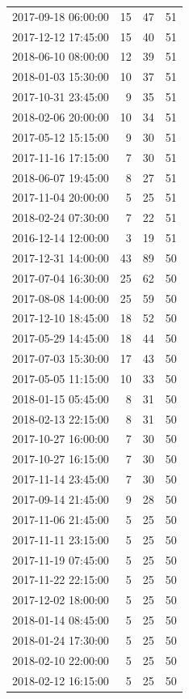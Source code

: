 \begin{tabular}{lrrr}
2017-09-18 06:00:00 & 15 & 47 & 51 \\
2017-12-12 17:45:00 & 15 & 40 & 51 \\
2018-06-10 08:00:00 & 12 & 39 & 51 \\
2018-01-03 15:30:00 & 10 & 37 & 51 \\
2017-10-31 23:45:00 & 9 & 35 & 51 \\
2018-02-06 20:00:00 & 10 & 34 & 51 \\
2017-05-12 15:15:00 & 9 & 30 & 51 \\
2017-11-16 17:15:00 & 7 & 30 & 51 \\
2018-06-07 19:45:00 & 8 & 27 & 51 \\
2017-11-04 20:00:00 & 5 & 25 & 51 \\
2018-02-24 07:30:00 & 7 & 22 & 51 \\
2016-12-14 12:00:00 & 3 & 19 & 51 \\
2017-12-31 14:00:00 & 43 & 89 & 50 \\
2017-07-04 16:30:00 & 25 & 62 & 50 \\
2017-08-08 14:00:00 & 25 & 59 & 50 \\
2017-12-10 18:45:00 & 18 & 52 & 50 \\
2017-05-29 14:45:00 & 18 & 44 & 50 \\
2017-07-03 15:30:00 & 17 & 43 & 50 \\
2017-05-05 11:15:00 & 10 & 33 & 50 \\
2018-01-15 05:45:00 & 8 & 31 & 50 \\
2018-02-13 22:15:00 & 8 & 31 & 50 \\
2017-10-27 16:00:00 & 7 & 30 & 50 \\
2017-10-27 16:15:00 & 7 & 30 & 50 \\
2017-11-14 23:45:00 & 7 & 30 & 50 \\
2017-09-14 21:45:00 & 9 & 28 & 50 \\
2017-11-06 21:45:00 & 5 & 25 & 50 \\
2017-11-11 23:15:00 & 5 & 25 & 50 \\
2017-11-19 07:45:00 & 5 & 25 & 50 \\
2017-11-22 22:15:00 & 5 & 25 & 50 \\
2017-12-02 18:00:00 & 5 & 25 & 50 \\
2018-01-14 08:45:00 & 5 & 25 & 50 \\
2018-01-24 17:30:00 & 5 & 25 & 50 \\
2018-02-10 22:00:00 & 5 & 25 & 50 \\
2018-02-12 16:15:00 & 5 & 25 & 50 \\

\end{tabular}
